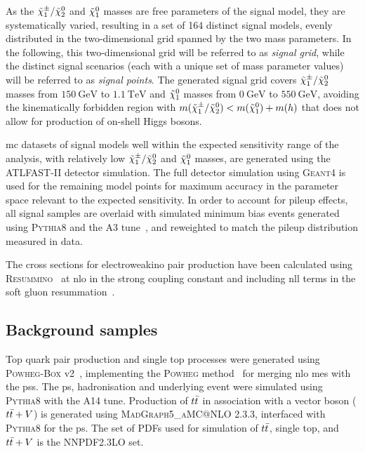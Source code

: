 As the $\tilde{\chi}_1^\pm/\tilde{\chi}_2^0$ and $\tilde{\chi}_1^0$ masses are free parameters of the signal model, they are systematically varied, resulting in a set of 164 distinct signal models, evenly distributed in the two-dimensional grid spanned by the two mass parameters. In the following, this two-dimensional grid will be referred to as \textit{signal grid}, while the distinct signal scenarios (each with a unique set of mass parameter values) will be referred to as \textit{signal points}. The generated signal grid covers $\tilde{\chi}_1^\pm/\tilde{\chi}_2^0$ masses from $\SI{150}{\GeV}$ to $\SI{1.1}{\TeV}$ and $\tilde{\chi}_1^0$ masses from $\SI{0}{\GeV}$ to $\SI{550}{\GeV}$, avoiding the kinematically forbidden region with $m(\tilde{\chi}_1^\pm/\tilde{\chi}_2^0) < m(\tilde{\chi}_1^0) + m(h)$ that does not allow for production of on-shell Higgs bosons.

\gls{mc} datasets of signal models well within the expected sensitivity range of the analysis, \ie with relatively low $\tilde{\chi}_1^\pm/\tilde{\chi}_2^0$ and $\tilde{\chi}_1^0$ masses, are generated using the \textsc{ATLFAST-II} detector simulation. The full detector simulation using \textsc{Geant4} is used for the remaining model points for maximum accuracy in the parameter space relevant to the expected sensitivity. In order to account for pileup effects, all signal samples are overlaid with simulated minimum bias events generated using \textsc{Pythia8} and the A3 tune~\cite{ATL-PHYS-PUB-2016-017}, and reweighted to match the pileup distribution measured in data. 

The cross sections for electroweakino pair production have been calculated using \textsc{Resummino}~\cite{Fuks:2013vua} at \gls{nlo} in the strong coupling constant and including \gls{nll} terms in the soft gluon resummation~\cite{Fiaschi:2018hgm,Fuks:2012qx}.

\subsection{Background samples}

Top quark pair production and single top processes were generated using \textsc{Powheg-Box} v2~\cite{PowhegBox:2010xd}, implementing the \textsc{Powheg} method~\cite{Powheg1,Powheg2} for merging \gls{nlo} \glspl{me} with the \glspl{ps}. The \gls{ps}, hadronisation and underlying event were simulated using \textsc{Pythia8} with the A14 tune. Production of $t\bar{t}$ in association with a vector boson ($t\bar{t}+V$) is generated using \textsc{MadGraph5\_aMC@NLO} 2.3.3, interfaced with \textsc{Pythia8} for the \gls{ps}. The set of \glspl{PDF} used for simulation of $t\bar{t}$, single top, and $t\bar{t}+V$ is the NNPDF2.3LO set.

